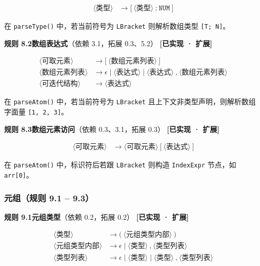 \documentclass[12pt,a4paper]{ctexart}
\begin{document}
\begin{align}
\langle\text{类型}\rangle &\rightarrow \texttt{[} \ \langle\text{类型}\rangle \ \texttt{;} \ \texttt{NUM} \ \texttt{]}
\end{align}

在 \texttt{parseType()} 中，若当前符号为 \texttt{LBracket} 则解析数组类型 \texttt{[T; N]}。

\textbf{规则 8.2\quad 数组表达式}（依赖 3.1，拓展 0.3、5.2） \hfill \textcolor{green!60!black}{\textbf{[已实现 · 扩展]}}

\begin{align}
\langle\text{可取元素}\rangle &\rightarrow \texttt{[} \ \langle\text{数组元素列表}\rangle \ \texttt{]} \\
\langle\text{数组元素列表}\rangle &\rightarrow \epsilon \mid \langle\text{表达式}\rangle \mid \langle\text{表达式}\rangle \ \texttt{,} \ \langle\text{数组元素列表}\rangle \\
\langle\text{可迭代结构}\rangle &\rightarrow \langle\text{表达式}\rangle
\end{align}

在 \texttt{parseAtom()} 中，若当前符号为 \texttt{LBracket} 且上下文非类型声明，则解析数组字面量 \texttt{[1, 2, 3]}。

\textbf{规则 8.3\quad 数组元素访问}（依赖 0.3、3.1，拓展 0.3） \hfill \textcolor{green!60!black}{\textbf{[已实现 · 扩展]}}

\begin{align}
\langle\text{可取元素}\rangle &\rightarrow \langle\text{可取元素}\rangle \ \texttt{[} \ \langle\text{表达式}\rangle \ \texttt{]}
\end{align}

在 \texttt{parseAtom()} 中，标识符后若跟 \texttt{LBracket} 则构造 \texttt{IndexExpr} 节点，如 \texttt{arr[0]}。

\subsubsection{元组（规则 9.1 -- 9.3）}

\textbf{规则 9.1\quad 元组类型}（依赖 0.2，拓展 0.2） \hfill \textcolor{green!60!black}{\textbf{[已实现 · 扩展]}}

\begin{align}
\langle\text{类型}\rangle &\rightarrow \texttt{(} \ \langle\text{元组类型内部}\rangle \ \texttt{)} \\
\langle\text{元组类型内部}\rangle &\rightarrow \epsilon \mid \langle\text{类型}\rangle \ \texttt{,} \ \langle\text{类型列表}\rangle \\
\langle\text{类型列表}\rangle &\rightarrow \epsilon \mid \langle\text{类型}\rangle \mid \langle\text{类型}\rangle \ \texttt{,} \ \langle\text{类型列表}\rangle
\end{align}
\end{document}
